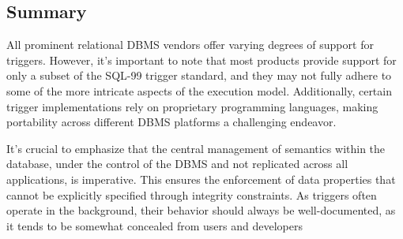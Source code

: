 \subsection*{Summary}
All prominent relational DBMS vendors offer varying degrees of support for triggers. 
However, it's important to note that most products provide support for only a subset of the SQL-99 trigger standard, and they may not fully adhere to some of the more intricate aspects of the execution model. 
Additionally, certain trigger implementations rely on proprietary programming languages, making portability across different DBMS platforms a challenging endeavor.

It's crucial to emphasize that the central management of semantics within the database, under the control of the DBMS and not replicated across all applications, is imperative. 
This ensures the enforcement of data properties that cannot be explicitly specified through integrity constraints. 
As triggers often operate in the background, their behavior should always be well-documented, as it tends to be somewhat concealed from users and developers